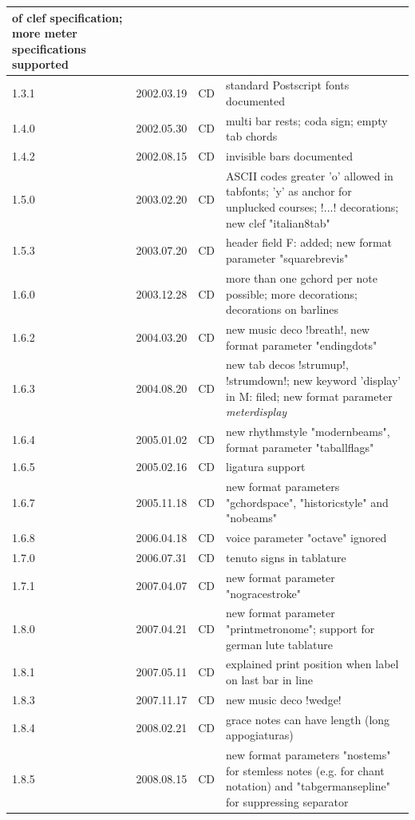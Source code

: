 \documentclass[a4paper]{article}
\begin{document}
\begin{center}
\begin{longtable}{|l|l|l|p{8cm}|}
    of clef specification; more meter specifications supported \\ \hline
1.3.1 & 2002.03.19 & CD & standard Postscript fonts documented \\ \hline
1.4.0 & 2002.05.30 & CD & multi bar rests; coda sign; 
	empty tab chords \\ \hline
1.4.2 & 2002.08.15 & CD & invisible bars documented \\ \hline
1.5.0 & 2003.02.20 & CD & ASCII codes greater 'o' allowed in tabfonts;
    'y' as anchor for unplucked courses; !...! decorations;
    new clef "italian8tab" \\ \hline
1.5.3 & 2003.07.20 & CD & header field F: added; new format parameter 
	"squarebrevis" \\ \hline
1.6.0 & 2003.12.28 & CD & more than one gchord per note possible; more
	decorations; decorations on barlines \\ \hline
1.6.2 & 2004.03.20 & CD & new music deco !breath!, new format parameter
	"endingdots" \\ \hline
1.6.3 & 2004.08.20 & CD & new tab decos !strumup!, !strumdown!;
	new keyword 'display' in M: filed; new format parameter
	{\it meterdisplay} \\ \hline
1.6.4 & 2005.01.02 & CD & new rhythmstyle "modernbeams", format parameter
	"taballflags" \\ \hline
1.6.5 & 2005.02.16 & CD & ligatura support \\ \hline
1.6.7 & 2005.11.18 & CD & new format parameters "gchordspace",
	"historicstyle" and "nobeams" \\ \hline
1.6.8 & 2006.04.18 & CD & voice parameter "octave" ignored \\ \hline
1.7.0 & 2006.07.31 & CD & tenuto signs in tablature \\ \hline
1.7.1 & 2007.04.07 & CD & new format parameter "nogracestroke" \\ \hline
1.8.0 & 2007.04.21 & CD & new format parameter "printmetronome";
    support for german lute tablature \\ \hline
1.8.1 & 2007.05.11 & CD & explained print position when label on last 
    bar in line \\ \hline
1.8.3 & 2007.11.17 & CD & new music deco !wedge! \\ \hline
1.8.4 & 2008.02.21 & CD & grace notes can have length (long appogiaturas)
    \\ \hline
1.8.5 & 2008.08.15 & CD & new format parameters "nostems" for stemless notes
    (e.g. for chant notation) and "tabgermansepline" for suppressing separator

\end{longtable}
\end{center}
\end{document}
